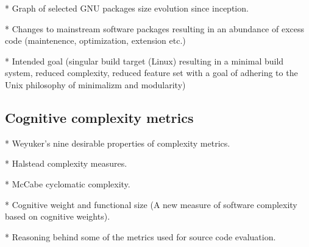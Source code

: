 * Graph of selected GNU packages size evolution since inception.

* Changes to mainstream software packages resulting in an abundance of excess code (maintenence, optimization, extension etc.)

* Intended goal (singular build target (Linux) resulting in a minimal build system, reduced complexity, reduced feature set with a goal of adhering to the Unix philosophy of minimalizm and modularity)


\subsection{Cognitive complexity metrics}

* Weyuker's nine desirable properties of complexity metrics.

* Halstead complexity measures.

* McCabe cyclomatic complexity.

* Cognitive weight and functional size (A new measure of software complexity based on cognitive weights).

* Reasoning behind some of the metrics used for source code evaluation.

